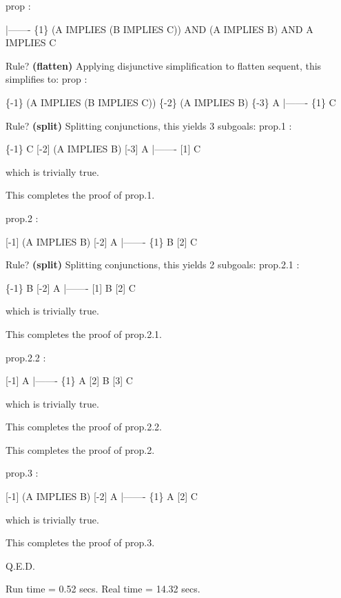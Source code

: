 \begin{pvsscript}
     prop :   

       |-------
     \{1\}   (A IMPLIES (B IMPLIES C)) AND (A IMPLIES B) AND A IMPLIES C

     Rule? {\bf (flatten)}
     Applying disjunctive simplification to flatten sequent,
     this simplifies to: 
     prop :   

     \{-1\}   (A IMPLIES (B IMPLIES C))
     \{-2\}   (A IMPLIES B)
     \{-3\}   A
       |-------
     \{1\}   C

     Rule? {\bf (split)}
     Splitting conjunctions,
     this yields  3 subgoals: 
     prop.1 :   

     \{-1\}   C
     [-2]   (A IMPLIES B)
     [-3]   A
       |-------
     [1]   C

     which is trivially true.

     This completes the proof of prop.1.

     prop.2 :   

     [-1]   (A IMPLIES B)
     [-2]   A
       |-------
     \{1\}   B
     [2]   C

     Rule? {\bf (split)}
     Splitting conjunctions,
     this yields  2 subgoals: 
     prop.2.1 :   

     \{-1\}   B
     [-2]   A
       |-------
     [1]   B
     [2]   C

     which is trivially true.

     This completes the proof of prop.2.1.

     prop.2.2 :   

     [-1]   A
       |-------
     \{1\}   A
     [2]   B
     [3]   C

     which is trivially true.

     This completes the proof of prop.2.2.


     This completes the proof of prop.2.

     prop.3 :   

     [-1]   (A IMPLIES B)
     [-2]   A
       |-------
     \{1\}   A
     [2]   C

     which is trivially true.

     This completes the proof of prop.3.

     Q.E.D.


     Run time  = 0.52 secs.
     Real time = 14.32 secs.
\end{pvsscript}

